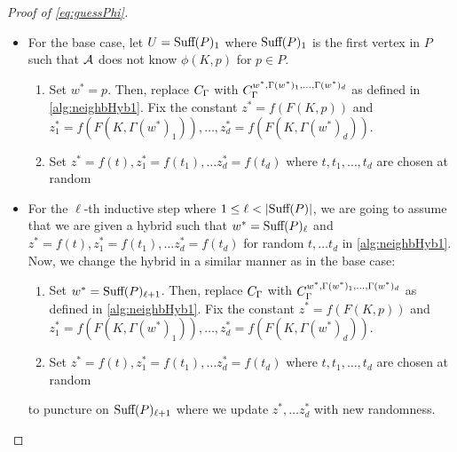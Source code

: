 \begin{proof}[Proof of \cref{eq:guessPhi}]
\begin{itemize}
		\begin{itemize}
			\item For the base case, 
			let $U = \text{Suff}(P)_1$
			where $\text{Suff}(P)_1$ is the first vertex in $P$ such that $\mathcal{A}$ does not know $\phi(K, p)$ for $p \in P$.
				\begin{enumerate}
					\item Set $w^* = p$. Then, replace $C_\Gamma$ with $C_\Gamma^{w^*, \Gamma(w^*)_1, \dots, \Gamma(w^*)_d}$ as defined in \cref{alg:neighbHyb1}.
					Fix the constant $z^* = f(F(K, p))$ and $z^*_1 = f(F(K, \Gamma(w^*)_1)), \dots, z^*_d = f(F(K, \Gamma(w^*)_d))$.
					\item Set $z^* = f(t), z^*_1 = f(t_1), \dots z^*_d = f(t_d)$ where $t, t_1, \dots, t_d$ are chosen at random %
				\end{enumerate}
			\item For the $\ell$-th inductive step where $1 \leq \ell < |\text{Suff}(P)|$, we are going to assume that we are given a hybrid such that 
			$w^* = \text{Suff}(P)_{\ell}$ and $z^* = f(t), z^*_1 = f(t_1), \dots z^*_d = f(t_d)$ for random $t, \dots t_d$ in \cref{alg:neighbHyb1}.
			Now, we change the hybrid in a similar manner as in the base case: \begin{enumerate}
				\item Set $w^* = \text{Suff}(P)_{\ell + 1}$. Then, replace $C_\Gamma$ with $C_\Gamma^{w^*, \Gamma(w^*)_1, \dots, \Gamma(w^*)_d}$ as defined in \cref{alg:neighbHyb1}.
				Fix the constant $z^* = f(F(K, p))$ and $z^*_1 = f(F(K, \Gamma(w^*)_1)), \dots, z^*_d = f(F(K, \Gamma(w^*)_d))$.
				\item Set $z^* = f(t), z^*_1 = f(t_1), \dots z^*_d = f(t_d)$ where $t, t_1, \dots, t_d$ are chosen at random %
			\end{enumerate}
			to puncture on $\text{Suff}(P)_{\ell + 1}$ where we update $z^*, \dots z^*_d$ 
			with new randomness.
			

\end{itemize}
\end{itemize}
\end{proof}
